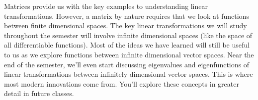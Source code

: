 
Matrices provide us with the key examples to understanding linear transformations. However, a matrix by nature requires that we look at functions between finite dimensional spaces.  The key linear transformations we will study throughout the semester will involve infinite dimensional spaces (like the space of all differentiable functions).  Most of the ideas we have learned will still be useful to us as we explore functions between infinite dimensional vector spaces. Near the end of the semester, we'll even start discussing eigenvalues and eigenfunctions of linear transformations between infinitely dimensional vector spaces. This is where most modern innovations come from. You'll explore these concepts in greater detail in future classes.
 










\mysubsection{\ideacon}






